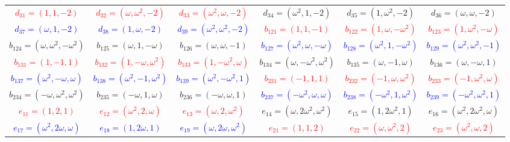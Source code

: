 \documentclass[%
  reprint,
  superscriptaddress,
  showpacs,
  showkeys,
  amsmath,amssymb,
  pra,
  longbibliography,
  floatfix,
  x11names
]{revtex4-2}
\begin{document}
\begin{table}[htbp!]
\begin{ruledtabular}
\begin{tabular}{*{6}{c}}
\textcolor{red}{$d_{31}=(1,1,-2)$} & \textcolor{red}{$d_{32}=(\omega,\omega^2,-2)$} & \textcolor{red}{$d_{33}=(\omega^2,\omega,-2)$} & \textcolor{green!40!black}{$d_{34}=(\omega^2,1,-2)$} & \textcolor{green!40!black}{$d_{35}=(1,\omega^2,-2)$} & \textcolor{green!40!black}{$d_{36}=(\omega,\omega,-2)$} \\
\textcolor{blue}{$d_{37}=(\omega,1,-2)$} & \textcolor{blue}{$d_{38}=(1,\omega,-2)$} & \textcolor{blue}{$d_{39}=(\omega^2,\omega^2,-2)$} & \textcolor{red}{$b_{121}=(1,1,-1)$} & \textcolor{red}{$b_{122}=(1,\omega,-\omega^2)$} & \textcolor{red}{$b_{123}=(1,\omega^2,-\omega)$} \\
\textcolor{green!40!black}{$b_{124}=(\omega,\omega^2,-\omega^2)$} & \textcolor{green!40!black}{$b_{125}=(\omega,1,-\omega)$} & \textcolor{green!40!black}{$b_{126}=(\omega,\omega,-1)$} & \textcolor{blue}{$b_{127}=(\omega^2,\omega,-\omega)$} & \textcolor{blue}{$b_{128}=(\omega^2,1,-\omega^2)$} & \textcolor{blue}{$b_{129}=(\omega^2,\omega^2,-1)$} \\
\textcolor{red}{$b_{131}=(1,-1,1)$} & \textcolor{red}{$b_{132}=(1,-\omega,\omega^2)$} & \textcolor{red}{$b_{133}=(1,-\omega^2,\omega)$} & \textcolor{green!40!black}{$b_{134}=(\omega,-\omega^2,\omega^2)$} & \textcolor{green!40!black}{$b_{135}=(\omega,-1,\omega)$} & \textcolor{green!40!black}{$b_{136}=(\omega,-\omega,1)$} \\
\textcolor{blue}{$b_{137}=(\omega^2,-\omega,\omega)$} & \textcolor{blue}{$b_{138}=(\omega^2,-1,\omega^2)$} & \textcolor{blue}{$b_{139}=(\omega^2,-\omega^2,1)$} & \textcolor{red}{$b_{231}=(-1,1,1)$} & \textcolor{red}{$b_{232}=(-1,\omega,\omega^2)$} & \textcolor{red}{$b_{233}=(-1,\omega^2,\omega)$} \\
\textcolor{green!40!black}{$b_{234}=(-\omega,\omega^2,\omega^2)$} & \textcolor{green!40!black}{$b_{235}=(-\omega,1,\omega)$} & \textcolor{green!40!black}{$b_{236}=(-\omega,\omega,1)$} & \textcolor{blue}{$b_{237}=(-\omega^2,\omega,\omega)$} & \textcolor{blue}{$b_{238}=(-\omega^2,1,\omega^2)$} & \textcolor{blue}{$b_{239}=(-\omega^2,\omega^2,1)$} \\
\textcolor{red}{$e_{11}=(1,2,1)$} & \textcolor{red}{$e_{12}=(\omega^2,2,\omega)$} & \textcolor{red}{$e_{13}=(\omega,2,\omega^2)$} & \textcolor{green!40!black}{$e_{14}=(\omega,2\omega^2,\omega^2)$} & \textcolor{green!40!black}{$e_{15}=(1,2\omega^2,1)$} & \textcolor{green!40!black}{$e_{16}=(\omega^2,2\omega^2,\omega)$} \\
\textcolor{blue}{$e_{17}=(\omega^2,2\omega,\omega)$} & \textcolor{blue}{$e_{18}=(1,2\omega,1)$} & \textcolor{blue}{$e_{19}=(\omega,2\omega,\omega^2)$} & \textcolor{red}{$e_{21}=(1,1,2)$} & \textcolor{red}{$e_{22}=(\omega,\omega^2,2)$} & \textcolor{red}{$e_{23}=(\omega^2,\omega,2)$} \\

\end{tabular}
\end{ruledtabular}
\end{table}
\end{document}
